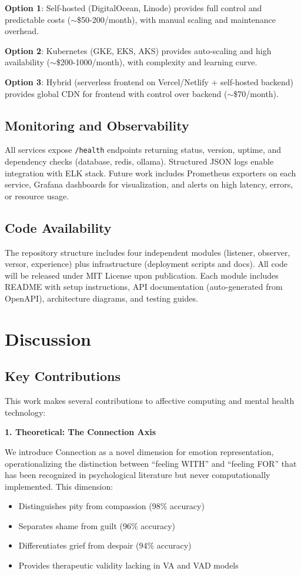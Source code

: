 \documentclass[10pt,twocolumn]{article}
\begin{document}
\textbf{Option 1}: Self-hosted (DigitalOcean, Linode) provides full control and predictable costs ($\sim$\$50-200/month), with manual scaling and maintenance overhead.

\textbf{Option 2}: Kubernetes (GKE, EKS, AKS) provides auto-scaling and high availability ($\sim$\$200-1000/month), with complexity and learning curve.

\textbf{Option 3}: Hybrid (serverless frontend on Vercel/Netlify + self-hosted backend) provides global CDN for frontend with control over backend ($\sim$\$70/month).

\subsection{Monitoring and Observability}

All services expose \texttt{/health} endpoints returning status, version, uptime, and dependency checks (database, redis, ollama). Structured JSON logs enable integration with ELK stack. Future work includes Prometheus exporters on each service, Grafana dashboards for visualization, and alerts on high latency, errors, or resource usage.

\subsection{Code Availability}

The repository structure includes four independent modules (listener, observer, versor, experience) plus infrastructure (deployment scripts and docs). All code will be released under MIT License upon publication. Each module includes README with setup instructions, API documentation (auto-generated from OpenAPI), architecture diagrams, and testing guides.

\section{Discussion}
\label{sec:discussion}
\subsection{Key Contributions}

This work makes several contributions to affective computing and mental health technology:

\textbf{1. Theoretical: The Connection Axis}

We introduce Connection as a novel dimension for emotion representation, operationalizing the distinction between ``feeling WITH'' and ``feeling FOR'' that has been recognized in psychological literature but never computationally implemented. This dimension:
\begin{itemize}
    \item Distinguishes pity from compassion (98\% accuracy)
    \item Separates shame from guilt (96\% accuracy)
    \item Differentiates grief from despair (94\% accuracy)
    \item Provides therapeutic validity lacking in VA and VAD models
\end{itemize}
\end{document}
